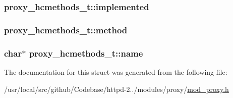 \subsubsection[{\texorpdfstring{implemented}{implemented}}]{ proxy\+\_\+hcmethods\+\_\+t\+::implemented}\hypertarget{structproxy__hcmethods__t_a2103f2b31be964ea6b43035e044291e1}{}\label{structproxy__hcmethods__t_a2103f2b31be964ea6b43035e044291e1}
\subsubsection[{\texorpdfstring{method}{method}}]{ proxy\+\_\+hcmethods\+\_\+t\+::method}\hypertarget{structproxy__hcmethods__t_a7bb77d4d3e11c52565841d119438a139}{}\label{structproxy__hcmethods__t_a7bb77d4d3e11c52565841d119438a139}
\subsubsection[{\texorpdfstring{name}{name}}]{\setlength{\rightskip}{0pt plus 5cm}char$\ast$ proxy\+\_\+hcmethods\+\_\+t\+::name}\hypertarget{structproxy__hcmethods__t_a31085efe0b3c49a5ffce47d7312be501}{}\label{structproxy__hcmethods__t_a31085efe0b3c49a5ffce47d7312be501}


The documentation for this struct was generated from the following file\+:\begin{DoxyCompactItemize}
\item 
/usr/local/src/github/\+Codebase/httpd-\/2../modules/proxy/\hyperlink{mod__proxy_8h}{mod\+\_\+proxy.\+h}\end{DoxyCompactItemize}
